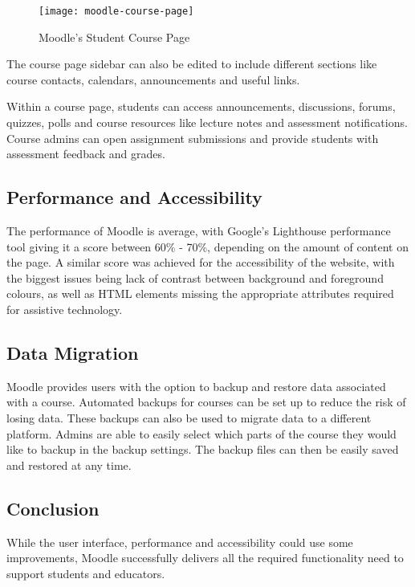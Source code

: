 \begin{figure}[h!]
    \centering
    \texttt{[image: moodle-course-page]}
    \caption{Moodle's Student Course Page}
\end{figure}

The course page sidebar can also be edited to include different sections like course contacts, calendars, announcements and useful links.

Within a course page, students can access announcements, discussions, forums, quizzes, polls and course resources like lecture notes and assessment notifications.
Course admins can open assignment submissions and provide students with assessment feedback and grades.

\subsection{Performance and Accessibility}
The performance of Moodle is average, with Google's Lighthouse performance tool giving it a score between 60\% - 70\%, depending on the amount of content on the page.
A similar score was achieved for the accessibility of the website, with the biggest issues being lack of contrast between background and foreground colours, as well as HTML elements missing the appropriate attributes required for assistive technology.

\subsection{Data Migration}
Moodle provides users with the option to backup and restore data associated with a course.
Automated backups for courses can be set up to reduce the risk of losing data.
These backups can also be used to migrate data to a different platform.
Admins are able to easily select which parts of the course they would like to backup in the backup settings.
The backup files can then be easily saved and restored at any time.

\subsection{Conclusion}
While the user interface, performance and accessibility could use some improvements, Moodle successfully delivers all the required functionality need to support students and educators.
